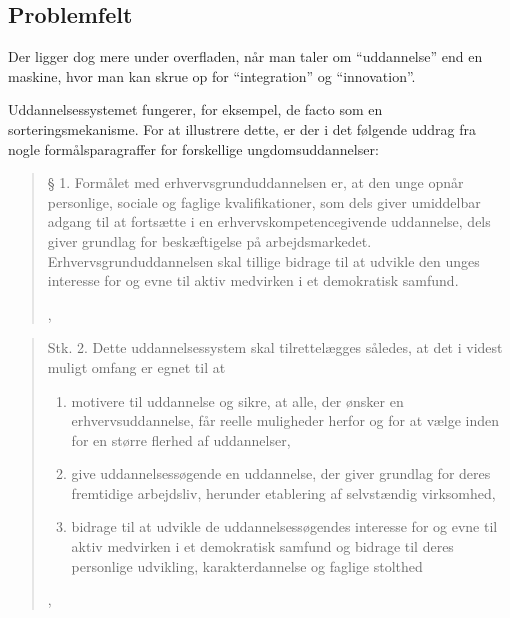 \subsection{Problemfelt}\label{sec:problem}
Der ligger dog mere under overfladen, når man taler om “uddannelse” end en maskine, hvor man kan skrue op for “integration” og “innovation”.

Uddannelsessystemet fungerer, for eksempel, de facto som en sorteringsmekanisme.
For at illustrere dette, er der i det følgende uddrag fra nogle formålsparagraffer for forskellige ungdomsuddannelser:

\blockquote[,  \cite{uddannelsesministerietBekendtgorelseAfLov2016a}]{
§ 1. Formålet med erhvervsgrunduddannelsen er, at den unge opnår personlige, sociale og faglige kvalifikationer, som dels giver umiddelbar adgang til at fortsætte i en erhvervskompetencegivende uddannelse, dels giver grundlag for beskæftigelse på arbejdsmarkedet. 
Erhvervsgrunduddannelsen skal tillige bidrage til at udvikle den unges interesse for og evne til aktiv medvirken i et demokratisk samfund.
}
\blockquote[,  \cite{uddannelsesministerietBekendtgorelseAfLov2020}]{
Stk. 2. Dette uddannelsessystem skal tilrettelægges således, at det i videst muligt omfang er egnet til at
\begin{enumerate}
  \item
    motivere til uddannelse og sikre, at alle, der ønsker en erhvervsuddannelse, får reelle muligheder herfor og for at vælge inden for en større flerhed af uddannelser,

  \item
    give uddannelsessøgende en uddannelse, der giver grundlag for deres fremtidige arbejdsliv, herunder etablering af selvstændig virksomhed,

  \item
    bidrage til at udvikle de uddannelsessøgendes interesse for og evne til aktiv medvirken i et demokratisk samfund og bidrage til deres personlige udvikling, karakterdannelse og faglige stolthed
\textins[\ldots]
\end{enumerate}
}

